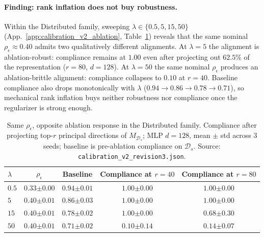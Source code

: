\documentclass[10pt]{article}
\theoremstyle{definition}
\theoremstyle{remark}
\begin{document}
\paragraph{Finding: rank inflation does not buy robustness.}
Within the Distributed family, sweeping
$\lambda \in \{0.5, 5, 15, 50\}$
(App.~\ref{app:calibration_v2_ablation},
Table~\ref{tab:calibration_lambda_sweep})
reveals that the same nominal
$\rho_{\epsilon}\!\approx\!0.40$ admits two
qualitatively different alignments.  At $\lambda=5$
the alignment is ablation-robust: compliance remains
at $1.00$ even after projecting out $62.5\%$ of the
representation ($r=80$, $d=128$).  At $\lambda=50$ the
same nominal $\rho_{\epsilon}$ produces an
ablation-brittle alignment: compliance collapses to
$0.10$ at $r=40$.  Baseline compliance also drops
monotonically with $\lambda$
($0.94 \to 0.86 \to 0.78 \to 0.71$), so mechanical
rank inflation buys neither robustness nor compliance
once the regularizer is strong enough.

\begin{table}[h]
\centering
\caption{Same $\rho_{\epsilon}$, opposite ablation
response in the Distributed family.  Compliance after
projecting top-$r$ principal directions of $M_{\mathcal{D}_s}$;
MLP $d=128$, mean $\pm$ std across $3$ seeds; baseline
is pre-ablation compliance on $\mathcal{D}_s$.  Source:
\texttt{calibration\_v2\_revision3.json}.}
\label{tab:calibration_lambda_sweep}
\begin{tabular}{@{}lcccc@{}}
\toprule
$\lambda$ & $\rho_{\epsilon}$ & Baseline
  & Compliance at $r=40$
  & Compliance at $r=80$ \\
\midrule
$0.5$ & $0.33{\scriptstyle\pm 0.00}$
      & $0.94{\scriptstyle\pm 0.01}$
      & $1.00{\scriptstyle\pm 0.00}$
      & $1.00{\scriptstyle\pm 0.00}$ \\
$5$   & $0.40{\scriptstyle\pm 0.01}$
      & $0.86{\scriptstyle\pm 0.03}$
      & $\mathbf{1.00}{\scriptstyle\pm 0.00}$
      & $\mathbf{1.00}{\scriptstyle\pm 0.00}$ \\
$15$  & $0.40{\scriptstyle\pm 0.01}$
      & $0.78{\scriptstyle\pm 0.02}$
      & $1.00{\scriptstyle\pm 0.00}$
      & $0.68{\scriptstyle\pm 0.30}$ \\
$50$  & $0.40{\scriptstyle\pm 0.01}$
      & $0.71{\scriptstyle\pm 0.02}$
      & $\mathbf{0.10}{\scriptstyle\pm 0.14}$
      & $0.14{\scriptstyle\pm 0.07}$ \\
\bottomrule
\end{tabular}
\end{table}
\end{document}
